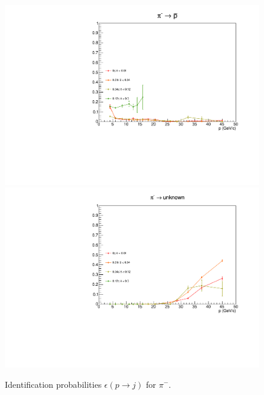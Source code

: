 \begin{figure}[!p]
  \includegraphics[scale=0.38]{./gfx/pim_p.pdf}
  \includegraphics[scale=0.38]{./gfx/pim_u.pdf}
	\caption{Identification probabilities $\epsilon(p \rightarrow j)$ for $\pi^-$.}
	\label{pic:Effpim}
\end{figure}


